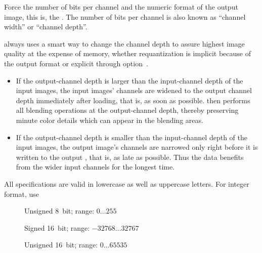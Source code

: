 \begin{codelist}
  \label{opt:depth}%
\item[\itempar{-d \metavar{DEPTH} \\ --depth=\metavar{DEPTH}}]\itemend
  Force the number of bits per channel and the numeric format of the output image, this is, the
  .  The number of bits per channel is also known as ``channel width'' or
  ``channel depth''.

  \App{} always uses a smart way to change the channel depth to assure
  highest image quality at the expense of memory, whether requantization is implicit because of
  the output format or explicit through option~.

  \begin{itemize}
  \item
    If the output-channel depth is larger than the input-channel depth of the input images, the
    input images' channels are widened to the output channel depth immediately after loading,
    that is, as soon as possible.  \App{} then performs all blending operations at the
    output-channel depth, thereby preserving minute color details which can appear in the
    blending areas.

  \item
    If the output-channel depth is smaller than the input-channel depth of the input images, the
    output image's channels are narrowed only right before it is written to the output
    , that is, as late as possible.  Thus the data benefits from the wider input
    channels for the longest time.
  \end{itemize}

  All  specifications are valid in lowercase as well as uppercase letters.  For
  integer format, use

  \begin{description}
  \item[]\itemend
    Unsigned 8~bit; range: $0\dots255$

  \item[]\itemend
    Signed 16~bit; range: $-32768\dots32767$

  \item[]\itemend
    Unsigned 16~bit; range: $0\dots65535$


\end{description}
\end{codelist}
